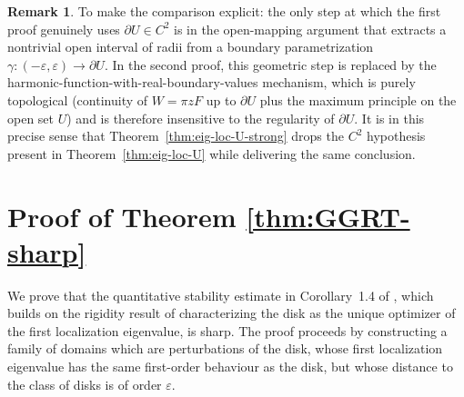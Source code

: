 \documentclass[a4paper,11pt,reqno]{amsart}
\numberwithin{equation}{section}
\theoremstyle{plain} %
\theoremstyle{definition} %
\newtheorem{remark}{Remark}[section]
\theoremstyle{remark}
\begin{document}
\begin{remark}
To make the comparison explicit: the only step at which the first proof
genuinely uses \(\partial U\in C^2\) is in the open-mapping argument that
extracts a nontrivial open interval of radii from a boundary parametrization
\(\gamma:(-\varepsilon,\varepsilon)\to\partial U\). In the second proof, this
geometric step is replaced by the harmonic-function-with-real-boundary-values
mechanism, which is purely topological (continuity of \(W=\pi zF\) up to
\(\partial U\) plus the maximum principle on the open set \(U\)) and is
therefore insensitive to the regularity of \(\partial U\). It is in this
precise sense that Theorem~\ref{thm:eig-loc-U-strong} drops the \(C^2\)
hypothesis present in Theorem~\ref{thm:eig-loc-U} while delivering the same
conclusion.
\end{remark}

\section{Proof of Theorem \ref{thm:GGRT-sharp}}

We prove that the quantitative stability estimate in Corollary~1.4 of
\cite{Gomez-Guerra-Ramos-Tilli}, which builds on the rigidity result of
\cite{Nicola-Tilli} characterizing the disk as the unique optimizer of the
first localization eigenvalue, is sharp. The proof proceeds by constructing a
family of domains which are perturbations of the disk, whose first localization
eigenvalue has the same first-order behaviour as the disk, but whose distance
to the class of disks is of order $\varepsilon$.
\end{document}

